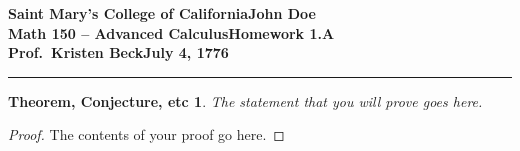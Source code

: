 \documentclass[11pt]{article}
\newcommand{\myname}{John Doe}
\newcommand{\assignment}{Homework 1.A}
\newcommand{\duedate}{July 4, 1776}
\newtheorem*{thmtype}{Theorem, Conjecture, etc}
\newcommand{\statement}{
The statement that you will prove goes here.
}
\newcommand{\myproof}{
The contents of your proof go here.
}
\begin{document}
\textbf{Saint Mary's College of California}\hfill\textbf{\myname}\\[0.01in]
\textbf{Math 150 -- Advanced Calculus}\hfill\textbf{\assignment}\\[0.01in]
\textbf{Prof.\ Kristen Beck}\hfill\textbf{\duedate}\\
\smallskip\hrule\bigskip

\begin{thmtype}
\statement
\end{thmtype}

\linespread{2}
\begin{proof}
\myproof
\end{proof}
\end{document}
